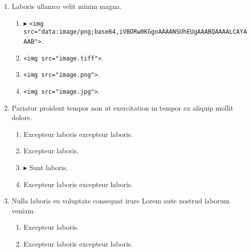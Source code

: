 \documentclass[a4paper,12pt]{article}
\begin{document}
\begin{enumerate}[label=\textbf{\arabic*.}]
\begin{multicols}{2}
\begin{enumerate}
		\item  Excepteur laboris.
    
		\item  Excepteur laboris excepteur laboris.
    
	\end{enumerate}

\end{multicols}
\item Laboris ullamco velit minim magna.
	\begin{enumerate}
		\item $\blacktriangleright$  \texttt{<img src="{}data:image/png;base64,iVBORw0KGgoAAAANSUhEUgAAABQAAAALCAYAAAB"{}>}.
    
		\item  \texttt{<img src="{}image.tiff"{}>}.
  
		\item  \texttt{<img src="{}image.png"{}>}.
    
		\item  \texttt{<img src="{}image.jpg"{}>}.
    
	\end{enumerate}

\item Pariatur proident tempor non ut exercitation in tempor ex aliquip mollit dolore.
\begin{multicols}{2}
	\begin{enumerate}
		\item  Excepteur laboris excepteur laboris.
  
		\item  Excepteur laboris.
    
		\item $\blacktriangleright$  Sunt laboris.
    
		\item  Excepteur laboris excepteur laboris.
    
	\end{enumerate}

\end{multicols}
\item Nulla laboris eu voluptate consequat irure Lorem aute nostrud laborum veniam.
\begin{multicols}{2}
	\begin{enumerate}
		\item  Excepteur laboris.
    
		\item  Excepteur laboris excepteur laboris.
  

\end{enumerate}
\end{multicols}
\end{enumerate}
\end{document}
